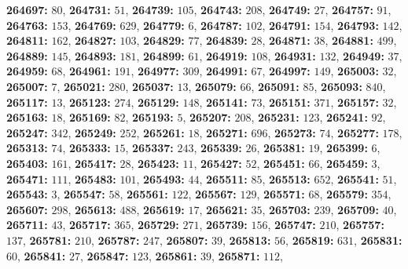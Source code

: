 \textsf{\bfseries 264697:} $80$, \textsf{\bfseries 264731:} $51$, \textsf{\bfseries 264739:} $105$, \textsf{\bfseries 264743:} $208$, \textsf{\bfseries 264749:} $27$, \textsf{\bfseries 264757:} $91$, \textsf{\bfseries 264763:} $153$, \textsf{\bfseries 264769:} $629$, \textsf{\bfseries 264779:} $6$, \textsf{\bfseries 264787:} $102$, \textsf{\bfseries 264791:} $154$, \textsf{\bfseries 264793:} $142$, \textsf{\bfseries 264811:} $162$, \textsf{\bfseries 264827:} $103$, \textsf{\bfseries 264829:} $77$, \textsf{\bfseries 264839:} $28$, \textsf{\bfseries 264871:} $38$, \textsf{\bfseries 264881:} $499$, \textsf{\bfseries 264889:} $145$, \textsf{\bfseries 264893:} $181$, \textsf{\bfseries 264899:} $61$, \textsf{\bfseries 264919:} $108$, \textsf{\bfseries 264931:} $132$, \textsf{\bfseries 264949:} $37$, \textsf{\bfseries 264959:} $68$, \textsf{\bfseries 264961:} $191$, \textsf{\bfseries 264977:} $309$, \textsf{\bfseries 264991:} $67$, \textsf{\bfseries 264997:} $149$, \textsf{\bfseries 265003:} $32$, \textsf{\bfseries 265007:} $7$, \textsf{\bfseries 265021:} $280$, \textsf{\bfseries 265037:} $13$, \textsf{\bfseries 265079:} $66$, \textsf{\bfseries 265091:} $85$, \textsf{\bfseries 265093:} $840$, \textsf{\bfseries 265117:} $13$, \textsf{\bfseries 265123:} $274$, \textsf{\bfseries 265129:} $148$, \textsf{\bfseries 265141:} $73$, \textsf{\bfseries 265151:} $371$, \textsf{\bfseries 265157:} $32$, \textsf{\bfseries 265163:} $18$, \textsf{\bfseries 265169:} $82$, \textsf{\bfseries 265193:} $5$, \textsf{\bfseries 265207:} $208$, \textsf{\bfseries 265231:} $123$, \textsf{\bfseries 265241:} $92$, \textsf{\bfseries 265247:} $342$, \textsf{\bfseries 265249:} $252$, \textsf{\bfseries 265261:} $18$, \textsf{\bfseries 265271:} $696$, \textsf{\bfseries 265273:} $74$, \textsf{\bfseries 265277:} $178$, \textsf{\bfseries 265313:} $74$, \textsf{\bfseries 265333:} $15$, \textsf{\bfseries 265337:} $243$, \textsf{\bfseries 265339:} $26$, \textsf{\bfseries 265381:} $19$, \textsf{\bfseries 265399:} $6$, \textsf{\bfseries 265403:} $161$, \textsf{\bfseries 265417:} $28$, \textsf{\bfseries 265423:} $11$, \textsf{\bfseries 265427:} $52$, \textsf{\bfseries 265451:} $66$, \textsf{\bfseries 265459:} $3$, \textsf{\bfseries 265471:} $111$, \textsf{\bfseries 265483:} $101$, \textsf{\bfseries 265493:} $44$, \textsf{\bfseries 265511:} $85$, \textsf{\bfseries 265513:} $652$, \textsf{\bfseries 265541:} $51$, \textsf{\bfseries 265543:} $3$, \textsf{\bfseries 265547:} $58$, \textsf{\bfseries 265561:} $122$, \textsf{\bfseries 265567:} $129$, \textsf{\bfseries 265571:} $68$, \textsf{\bfseries 265579:} $354$, \textsf{\bfseries 265607:} $298$, \textsf{\bfseries 265613:} $488$, \textsf{\bfseries 265619:} $17$, \textsf{\bfseries 265621:} $35$, \textsf{\bfseries 265703:} $239$, \textsf{\bfseries 265709:} $40$, \textsf{\bfseries 265711:} $43$, \textsf{\bfseries 265717:} $365$, \textsf{\bfseries 265729:} $271$, \textsf{\bfseries 265739:} $156$, \textsf{\bfseries 265747:} $210$, \textsf{\bfseries 265757:} $137$, \textsf{\bfseries 265781:} $210$, \textsf{\bfseries 265787:} $247$, \textsf{\bfseries 265807:} $39$, \textsf{\bfseries 265813:} $56$, \textsf{\bfseries 265819:} $631$, \textsf{\bfseries 265831:} $60$, \textsf{\bfseries 265841:} $27$, \textsf{\bfseries 265847:} $123$, \textsf{\bfseries 265861:} $39$, \textsf{\bfseries 265871:} $112$, 
